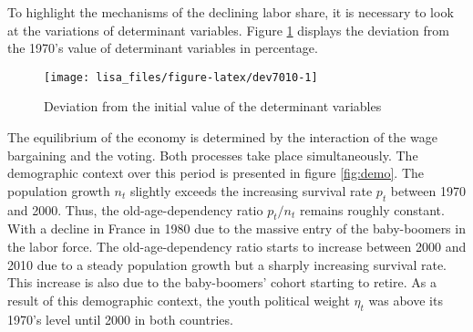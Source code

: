 \documentclass[
]{article}
\begin{document}
To highlight the mechanisms of the declining labor share, it is necessary to look at the variations of determinant variables.
Figure \ref{fig:dev7010} displays the deviation from the 1970's value of determinant variables in percentage.

\begin{figure}[!tb]

{\centering \texttt{[image: lisa\_files/figure-latex/dev7010-1]} 

}

\caption{Deviation from the initial value of the determinant variables}\label{fig:dev7010}
\end{figure}

The equilibrium of the economy is determined by the interaction of the wage bargaining and the voting. Both processes take place simultaneously. The demographic context over this period is presented in figure \ref{fig:demo}. The population growth \(n_t\) slightly exceeds the increasing survival rate \(p_t\) between 1970 and 2000. Thus, the old-age-dependency ratio \(p_t/n_t\) remains roughly constant. With a decline in France in 1980 due to the massive entry of the baby-boomers in the labor force. The old-age-dependency ratio starts to increase between 2000 and 2010 due to a steady population growth but a sharply increasing survival rate. This increase is also due to the baby-boomers' cohort starting to retire. As a result of this demographic context, the youth political weight \(\eta_t\) was above its 1970's level until 2000 in both countries.
\end{document}
